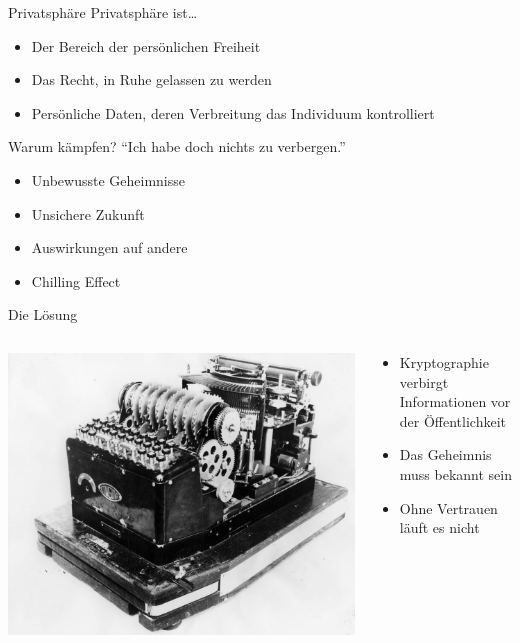 \documentclass[aspectratio=1610]{beamer}
\begin{document}
  \begin{frame}{Privatsphäre}
    Privatsphäre ist…
    \begin{itemize}
      \pause
      \item Der Bereich der persönlichen Freiheit
      \pause
      \item Das Recht, in Ruhe gelassen zu werden
      \pause
      \item Persönliche Daten, deren Verbreitung das Individuum kontrolliert
    \end{itemize}
  \end{frame}

  \begin{frame}{Warum kämpfen?}
    “Ich habe doch nichts zu verbergen.”
    \begin{itemize}
      \item Unbewusste Geheimnisse
      \item Unsichere Zukunft
      \item Auswirkungen auf andere
      \item Chilling Effect
    \end{itemize}
  \end{frame}

  \begin{frame}{Die Lösung}
    \begin{columns}
      \begin{column}{.5\textwidth}
        \includegraphics[width=\textwidth]{enigma.jpg}
      \end{column}
      \begin{column}{.5\textwidth}
        \begin{itemize}
          \pause
          \item Kryptographie verbirgt Informationen vor der Öffentlichkeit
          \pause
          \item Das Geheimnis muss bekannt sein
          \pause
          \item Ohne Vertrauen läuft es nicht
        \end{itemize}
      \end{column}
    \end{columns}
  \end{frame}
\end{document}
